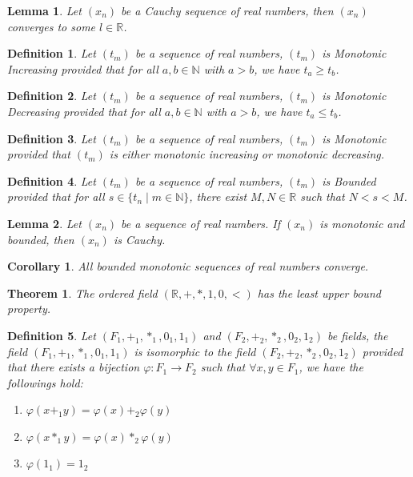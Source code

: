 \documentclass[11pt]{article}
\theoremstyle{break}
\theoremstyle{break}
\newtheorem{thm}{Theorem}[section]
\newtheorem{lem}{Lemma}[thm]
\newtheorem{corL}{Corollary}[lem]
\newtheorem{defn}{Definition}[corL]
\newcommand{\R}{\mathbb{R}}
\newcommand{\N}{\mathbb{N}}
\begin{document}
	\begin{lem}
		Let $(x_n)$ be a Cauchy sequence of real numbers, then $(x_n)$ converges to some $l \in \R$.
	\end{lem}

	\begin{defn}
	Let $(t_m)$ be a sequence of real numbers, $(t_m)$ is Monotonic Increasing provided that for all $a,b \in \N$ with $a>b$, we have $t_a \geq t_b$.
	\end{defn}
	
	\begin{defn}
	Let $(t_m)$ be a sequence of real numbers, $(t_m)$ is Monotonic Decreasing provided that for all $a,b \in \N$ with $a>b$, we have $t_a \leq t_b$.
	\end{defn}
		
	\begin{defn}
	Let $(t_m)$ be a sequence of real numbers, $(t_m)$ is Monotonic provided that $(t_m)$ is either monotonic increasing or monotonic decreasing.
	\end{defn}
	
	\begin{defn}
	Let $(t_m)$ be a sequence of real numbers, $(t_m)$ is Bounded provided that for all $s \in \{t_n \mid m \in \N \}$, there exist $M,N \in \R$ such that $N < s < M$.
	\end{defn}
		
	\begin{lem}
		Let $(x_n)$ be a sequence of real numbers. If $(x_n)$ is monotonic and bounded, then $(x_n)$ is Cauchy.
	\end{lem}
	
	\begin{corL}
		All bounded monotonic sequences of real numbers converge.
	\end{corL}
	
	\begin{thm}
		The ordered field $(\R,+,\ast,1,0,<)$ has the least upper bound property.
	\end{thm}

	\begin{defn}	
		Let $(F_1,+_1,\ast_1,0_1,1_1)$ and $(F_2,+_2,\ast_2,0_2,1_2)$ be fields, the field $(F_1,+_1,\ast_1,0_1,1_1)$ is isomorphic to the field $(F_2,+_2,\ast_2,0_2,1_2)$ provided that there exists a bijection $\varphi:F_1 \to F_2$ such that $\forall x,y \in F_1$, we have the followings hold:
		\begin{enumerate}[topsep=3pt,itemsep=-1ex,partopsep=1ex,parsep=1ex]
			\item $\varphi(x +_1 y)=\varphi(x)+_2 \varphi(y)$
			\item $\varphi(x \ast_1 y)=\varphi(x)\ast_2 \varphi(y)$
			\item $\varphi(1_1)=1_2$
		\end{enumerate}
	\end{defn}
	
\end{document}
